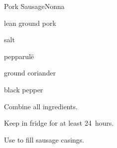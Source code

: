 \begin{recipe}{Pork Sausage}{Nonna}{}

\begin{ingredients}
\item lean ground pork
\item salt
\item pepparul\"e
\item ground coriander
\item black pepper
\end{ingredients}

\begin{directions}
\item Combine all ingredients.
\item Keep in fridge for at least 24~hours.
\item Use to fill sausage casings.
\end{directions}

\end{recipe}
